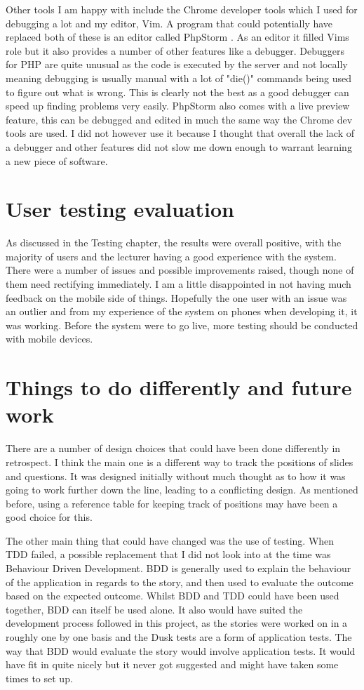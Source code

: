 Other tools I am happy with include the Chrome developer tools which I used for debugging a lot and my editor, Vim. A program that could potentially have replaced both of these is an editor called PhpStorm \cite{phpstorm}. As an editor it filled Vims role but it also provides a number of other features like a debugger. Debuggers for PHP are quite unusual as the code is executed by the server and not locally meaning debugging is usually manual with a lot of "die()" commands being used to figure out what is wrong. This is clearly not the best as a good debugger can speed up finding problems very easily. PhpStorm also comes with a live preview feature, this can be debugged and edited in much the same way the Chrome dev tools are used. I did not however use it because I thought that overall the lack of a debugger and other features did not slow me down enough to warrant learning a new piece of software.

\section{User testing evaluation}
As discussed in the Testing chapter, the results were overall positive, with the majority of users and the lecturer having a good experience with the system. There were a number of issues and possible improvements raised, though none of them need rectifying immediately. I am a little disappointed in not having much feedback on the mobile side of things. Hopefully the one user with an issue was an outlier and from my experience of the system on phones when developing it, it was working. Before the system were to go live, more testing should be conducted with mobile devices.

\section{Things to do differently and future work}
There are a number of design choices that could have been done differently in retrospect. I think the main one is a different way to track the positions of slides and questions. It was designed initially without much thought as to how it was going to work further down the line, leading to a conflicting design. As mentioned before, using a reference table for keeping track of positions may have been a good choice for this.

The other main thing that could have changed was the use of testing. When TDD failed, a possible replacement that I did not look into at the time was Behaviour Driven Development\cite{bdd}. BDD is generally used to explain the behaviour of the application in regards to the story, and then used to evaluate the outcome based on the expected outcome. Whilst BDD and TDD could have been used together, BDD can itself be used alone. It also would have suited the development process followed in this project, as the stories were worked on in a roughly one by one basis and the Dusk tests are a form of application tests. The way that BDD would evaluate the story would involve application tests. It would have fit in quite nicely but it never got suggested and might have taken some times to set up.

